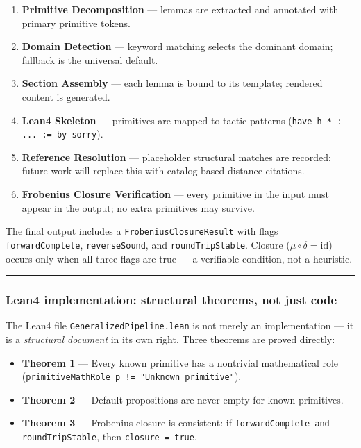 \documentclass[12pt,a4paper]{article}
\begin{document}
\begin{enumerate}
    \item \textbf{Primitive Decomposition} --- lemmas are extracted and annotated with primary primitive tokens.
    \item \textbf{Domain Detection} --- keyword matching selects the dominant domain; fallback is the universal default.
    \item \textbf{Section Assembly} --- each lemma is bound to its template; rendered content is generated.
    \item \textbf{Lean4 Skeleton} --- primitives are mapped to tactic patterns (\texttt{have h\_* : ... := by sorry}).
    \item \textbf{Reference Resolution} --- placeholder structural matches are recorded; future work will replace this with catalog-based distance citations.
    \item \textbf{Frobenius Closure Verification} --- every primitive in the input must appear in the output; no extra primitives may survive.
\end{enumerate}

The final output includes a \texttt{FrobeniusClosureResult} with flags \texttt{forwardComplete}, \texttt{reverseSound}, and \texttt{roundTripStable}. Closure ($\mu \circ \delta = \mathrm{id}$) occurs only when all three flags are true --- a verifiable condition, not a heuristic.

\begin{center}
\rule{0.5\textwidth}{0.4pt}
\end{center}

\subsubsection{Lean4 implementation: structural theorems, not just code}

The Lean4 file \texttt{GeneralizedPipeline.lean} is not merely an implementation --- it is a \emph{structural document} in its own right. Three theorems are proved directly:

\begin{itemize}
    \item \textbf{Theorem 1} --- Every known primitive has a nontrivial mathematical role (\texttt{primitiveMathRole p != "Unknown primitive"}).
    \item \textbf{Theorem 2} --- Default propositions are never empty for known primitives.
    \item \textbf{Theorem 3} --- Frobenius closure is consistent: if \texttt{forwardComplete and roundTripStable}, then \texttt{closure = true}.
\end{itemize}
\end{document}
